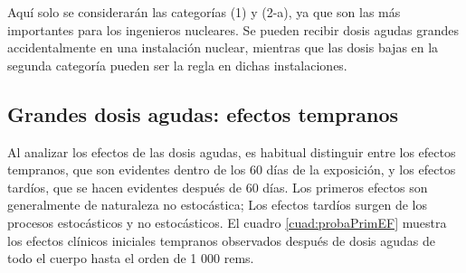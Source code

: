 \documentclass[]{article}
\begin{document}
Aquí solo se considerarán las categorías (1) y (2-a), ya que son las más importantes para los ingenieros nucleares. Se pueden recibir dosis agudas grandes accidentalmente en una instalación nuclear, mientras que las dosis bajas en la segunda categoría pueden ser la regla en dichas instalaciones.\\

\subsection{Grandes dosis agudas: efectos tempranos}

Al analizar los efectos de las dosis agudas, es habitual distinguir entre los efectos tempranos, que son evidentes dentro de los 60 días de la exposición, y los efectos tardíos, que se hacen evidentes después de 60 días. Los primeros efectos son generalmente de naturaleza no estocástica; Los efectos tardíos surgen de los procesos estocásticos y no estocásticos. El cuadro \ref{cuad:probaPrimEF} muestra los efectos clínicos iniciales tempranos observados después de dosis agudas de todo el cuerpo hasta el orden de 1 000 rems.\\
\end{document}
